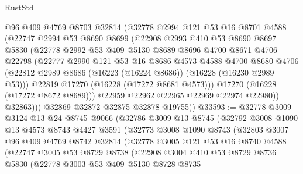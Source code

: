 \begin{lexlean}{RustStd}
\begin{coremodule}
            @96
            @409
            @4769
            @8703
            @32814
            (@32778
              @2994
              @121
              @53
              @16
              @8701
              @4588
              (@22747
                @2994
                @53
                @8690
                @8699
                (@22908
                  @2993
                  @410
                  @53
                  @8690
                  @8697
                  @5830
                  (@22778
                    @2992
                    @53
                    @409
                    @5130
                    @8689
                    @8696
                    @4700
                    @8671
                    @4706
                    @22798
                    (@22777
                      @2990
                      @121
                      @53
                      @16
                      @8686
                      @4573
                      @4588
                      @4700
                      @8680
                      @4706
                      (@22812 @2989 @8686 (@16223 (@16224 @8686)) (@16228 (@16230 @2989 @53)))
                      @22819
                      @17270
                      (@16228 (@17272 @8681 @4573)))
                    @17270
                    (@16228 (@17272 @8672 @8689)))
                  @22959
                  @22962
                  @22965
                  @22969
                  @22974
                  @22980))
              @32863)))
        @32869
        @32872
        @32875
        @32878
        @19755))
@33593 := @32778
    @3009
    @3124
    @13
    @24
    @8745
    @9066
    (@32786
      @3009
      @13
      @8745
      (@32792
        @3008
        @1090
        @13
        @4573
        @8743
        @4427
        @3591
        (@32773
          @3008
          @1090
          @8743
          (@32803
            @3007
            @96
            @409
            @4769
            @8742
            @32814
            (@32778
              @3005
              @121
              @53
              @16
              @8740
              @4588
              (@22747
                @3005
                @53
                @8729
                @8738
                (@22908
                  @3004
                  @410
                  @53
                  @8729
                  @8736
                  @5830
                  (@22778
                    @3003
                    @53
                    @409
                    @5130
                    @8728
                    @8735

\end{coremodule}
\end{lexlean}
